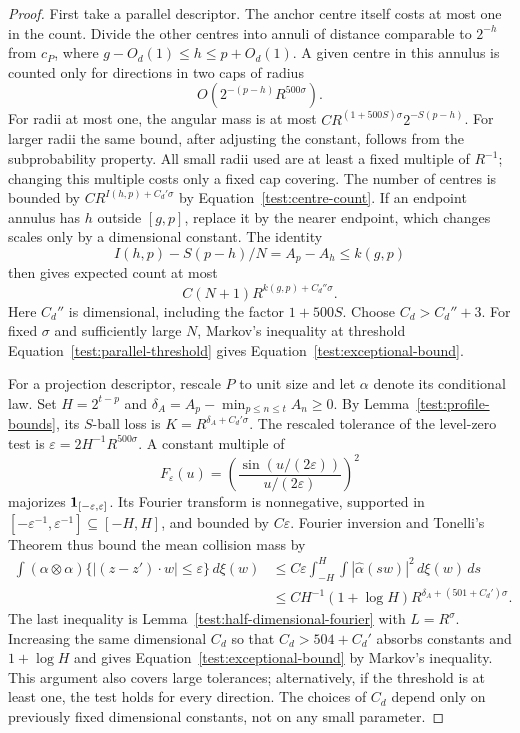 \begin{proof}
First take a parallel descriptor.  The anchor centre itself costs at
most one in the count.  Divide the other centres into annuli of
distance comparable to $2^{-h}$ from $c_P$, where
$g-O_d(1)\le h\le p+O_d(1)$.  A given centre in this annulus is counted
only for directions in two caps of radius
\[
O(2^{-(p-h)}R^{500\sigma}).
\]
For radii at most one, the angular mass is at most
$C R^{(1+500S)\sigma}2^{-S(p-h)}$.  For larger radii the same bound,
after adjusting the constant, follows from the subprobability
property.  All small radii used are at least a fixed multiple of
$R^{-1}$; changing this multiple costs only a fixed cap covering.
The number of centres is bounded by
$C R^{I(h,p)+C_d'\sigma}$ by
Equation~\eqref{test:centre-count}.  If an endpoint annulus has
$h$ outside $[g,p]$, replace it by the nearer endpoint, which changes
scales only by a dimensional constant.  The identity
\[
I(h,p)-S(p-h)/N=A_p-A_h\le k(g,p)
\]
then gives expected count at most
\[
C(N+1)R^{k(g,p)+C_d''\sigma}.
\]
Here $C_d''$ is dimensional, including the factor $1+500S$.
Choose $C_d>C_d''+3$.  For fixed $\sigma$ and sufficiently large $N$,
Markov's inequality at threshold
Equation~\eqref{test:parallel-threshold} gives
Equation~\eqref{test:exceptional-bound}.

For a projection descriptor, rescale $P$ to unit size and let
$\alpha$ denote its conditional law.  Set $H=2^{t-p}$ and
$\delta_A=A_p-\min_{p\le n\le t}A_n\ge0$.  By
Lemma~\ref{test:profile-bounds}, its $S$-ball loss is
$K=R^{\delta_A+C_d'\sigma}$.  The rescaled tolerance of the
level-zero test is
$\varepsilon=2H^{-1}R^{500\sigma}$.  A constant multiple of
\[
F_\varepsilon(u)=
 \left(\frac{\sin(u/(2\varepsilon))}{u/(2\varepsilon)}\right)^2
\]
majorizes $\mathbf 1_{[-\varepsilon,\varepsilon]}$.  Its Fourier transform
is nonnegative, supported in
$[-\varepsilon^{-1},\varepsilon^{-1}]\subseteq[-H,H]$, and bounded
by $C\varepsilon$.  Fourier inversion and Tonelli's Theorem thus
bound the mean collision mass by
\[
\begin{split}
\int (\alpha\otimes\alpha)
 \{|(z-z')\cdot w|\le\varepsilon\}\,d\xi(w)
&\le C\varepsilon
 \int_{-H}^H\int|\widehat\alpha(sw)|^2\,d\xi(w)\,ds\\
&\le C H^{-1}(1+\log H)
 R^{\delta_A+(501+C_d')\sigma}.
\end{split}
\]
The last inequality is Lemma~\ref{test:half-dimensional-fourier}
with $L=R^\sigma$.  Increasing the same dimensional $C_d$ so that
$C_d>504+C_d'$ absorbs constants and $1+\log H$ and gives
Equation~\eqref{test:exceptional-bound} by Markov's inequality.
This argument also covers large tolerances; alternatively, if the
threshold is at least one, the test holds for every direction.
The choices of $C_d$ depend only on previously fixed dimensional
constants, not on any small parameter.
\end{proof}

